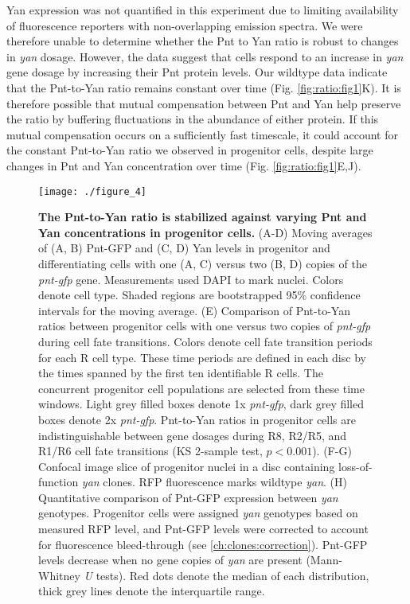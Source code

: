 Yan expression was not quantified in this experiment due to limiting availability of fluorescence reporters with non-overlapping emission spectra. We were therefore unable to determine whether the Pnt to Yan ratio is robust to changes in \textit{yan} dosage. However, the data suggest that cells respond to an increase in \textit{yan} gene dosage by increasing their Pnt protein levels. Our wildtype data indicate that the Pnt-to-Yan ratio remains constant over time (Fig. \ref{fig:ratio:fig1}K). It is therefore possible that mutual compensation between Pnt and Yan help preserve the ratio by buffering fluctuations in the abundance of either protein. If this mutual compensation occurs on a sufficiently fast timescale, it could account for the constant Pnt-to-Yan ratio we observed in progenitor cells, despite large changes in Pnt and Yan concentration over time (Fig. \ref{fig:ratio:fig1}E,J).

\begin{figure}[p!]
\centering
\texttt{[image: ./figure\_4]}
\caption[The Pnt-to-Yan ratio is stabilized against varying Pnt and Yan concentrations in progenitor cells.]{\textbf{The Pnt-to-Yan ratio is stabilized against varying Pnt and Yan concentrations in progenitor cells.} (A-D) Moving averages of (A, B) Pnt-GFP and (C, D) Yan levels in progenitor and differentiating cells with one (A, C) versus two (B, D) copies of the \textit{pnt-gfp} gene. Measurements used DAPI to mark nuclei. Colors denote cell type. Shaded regions are bootstrapped 95\% confidence intervals for the moving average. (E) Comparison of Pnt-to-Yan ratios between progenitor cells with one versus two copies of \textit{pnt-gfp} during cell fate transitions. Colors denote cell fate transition periods for each R cell type. These time periods are defined in each disc by the times spanned by the first ten identifiable R cells. The concurrent progenitor cell populations are selected from these time windows. Light grey filled boxes denote 1x \textit{pnt-gfp}, dark grey filled boxes denote 2x \textit{pnt-gfp}. Pnt-to-Yan ratios in progenitor cells are indistinguishable between gene dosages during R8, R2/R5, and R1/R6 cell fate transitions (KS 2-sample test, $p<0.001$). (F-G) Confocal image slice of progenitor nuclei in a disc containing loss-of-function \textit{yan} clones. RFP fluorescence marks wildtype \textit{yan}. (H) Quantitative comparison of Pnt-GFP expression between \textit{yan} genotypes. Progenitor cells were assigned \textit{yan} genotypes based on measured RFP level, and Pnt-GFP levels were corrected to account for fluorescence bleed-through (see \ref{ch:clones:correction}). Pnt-GFP levels decrease when no gene copies of \textit{yan} are present (Mann-Whitney \textit{U} tests). Red dots denote the median of each distribution, thick grey lines denote the interquartile range.}
\label{fig:ratio:fig4}
\end{figure}

